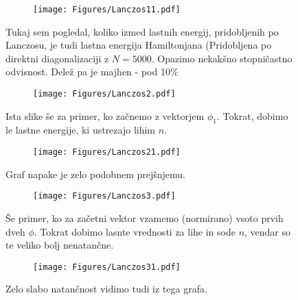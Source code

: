 \documentclass{article}
\begin{document}
\begin{figure}[H]
\centering
\begin{subfigure}{.7\textwidth}
\texttt{[image: Figures/Lanczos11.pdf]}
\end{subfigure}
\caption*{Tukaj sem pogledal, koliko izmed lastnih energij, pridobljenih po Lanczosu, je tudi lastna energija Hamiltonjana (Pridobljena po direktni diagonalizaciji z $N=5000$. Opazimo nekakšno stopničastno odvisnost. Delež pa je majhen - pod 10\%}
\end{figure}

\begin{figure}[H]
\centering
\begin{subfigure}{.7\textwidth}
\texttt{[image: Figures/Lanczos2.pdf]}
\end{subfigure}
\caption*{Ista slike še za primer, ko začnemo z vektorjem $\phi_1$. Tokrat, dobimo le lastne energije, ki ustrezajo lihim $n$.}
\end{figure}

\begin{figure}[H]
\centering
\begin{subfigure}{.7\textwidth}
\texttt{[image: Figures/Lanczos21.pdf]}
\end{subfigure}
\caption*{Graf napake je zelo podobnem prejšnjemu.}
\end{figure}

\begin{figure}[H]
\centering
\begin{subfigure}{.7\textwidth}
\texttt{[image: Figures/Lanczos3.pdf]}
\end{subfigure}
\caption*{Še primer, ko za začetni vektor vzamemo (normirano) vsoto prvih dveh $\phi$. Tokrat dobimo lasnte vrednosti za lihe in sode $n$, vendar so te veliko bolj nenatančne.}
\end{figure}

\begin{figure}[H]
\centering
\begin{subfigure}{.7\textwidth}
\texttt{[image: Figures/Lanczos31.pdf]}
\end{subfigure}
\caption*{Zelo slabo natančnost vidimo tudi iz tega grafa.}
\end{figure}
\end{document}
